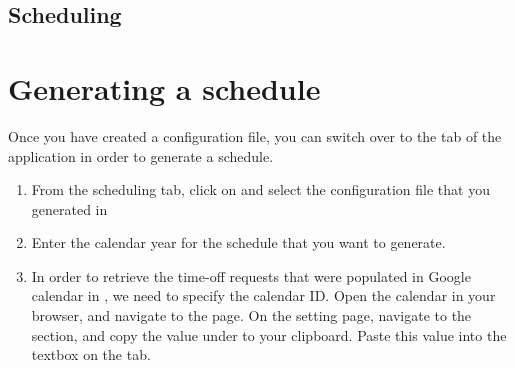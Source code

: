 \documentclass[letterpaper,10pt,english]{sphinxmanual}
\begin{document}
\begin{figure}[H]
\centering
{}\end{figure}


\subsection{Scheduling}
\label{\detokenize{manual:scheduling}}

\section{Generating a schedule}
\label{\detokenize{manual:generating-a-schedule}}\label{\detokenize{manual:id3}}
Once you have created a configuration file, you can switch over to the
 tab of the application in order to generate a schedule.
\begin{enumerate}
\item {} 
From the scheduling tab, click on  and select the configuration
file that you generated in {\hyperref[\detokenize{manual:clinician-configuration}]{}}

\end{enumerate}

\begin{figure}[H]
\centering
{}\end{figure}
\begin{enumerate}
\setcounter{enumi}{1}
\item {} 
Enter the calendar year for the schedule that you want to generate.

\end{enumerate}

\begin{figure}[H]
\centering
{}\end{figure}
\begin{enumerate}
\setcounter{enumi}{2}
\item {} 
 In order to retrieve the time-off requests that were populated
in Google calendar in , we need to specify the
calendar ID. Open the calendar in your browser, and navigate to the
 page.
On the setting page, navigate to the  section, and copy
the value under  to your clipboard.
Paste this value into the  textbox on the 
tab.

\end{enumerate}
\end{document}
